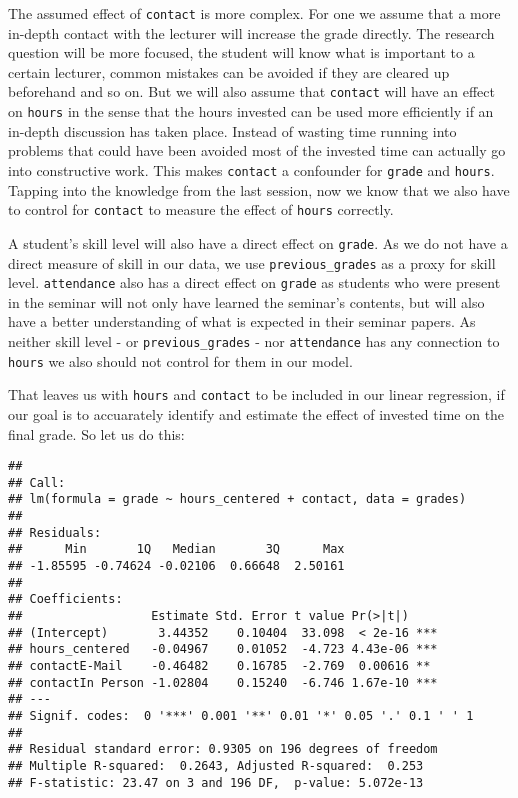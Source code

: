 \documentclass[
]{book}
\begin{document}
The assumed effect of \texttt{contact} is more complex. For one we assume that a more
in-depth contact with the lecturer will increase the grade directly. The
research question will be more focused, the student will know what is important
to a certain lecturer, common mistakes can be avoided if they are cleared up
beforehand and so on. But we will also assume that \texttt{contact} will have an effect
on \texttt{hours} in the sense that the hours invested can be used more efficiently if
an in-depth discussion has taken place. Instead of wasting time running into
problems that could have been avoided most of the invested time can actually go
into constructive work. This makes \texttt{contact} a confounder for \texttt{grade} and
\texttt{hours}. Tapping into the knowledge from the last session, now we know that we
also have to control for \texttt{contact} to measure the effect of \texttt{hours} correctly.

A student's skill level will also have a direct effect on \texttt{grade}. As we do not
have a direct measure of skill in our data, we use \texttt{previous\_grades} as a proxy
for skill level. \texttt{attendance} also has a direct effect on \texttt{grade} as students
who were present in the seminar will not only have learned the seminar's
contents, but will also have a better understanding of what is expected in their
seminar papers. As neither skill level - or \texttt{previous\_grades} - nor \texttt{attendance}
has any connection to \texttt{hours} we also should not control for them in our model.

That leaves us with \texttt{hours} and \texttt{contact} to be included in our linear
regression, if our goal is to accuarately identify and estimate the effect of
invested time on the final grade. So let us do this:

\begin{verbatim}
## 
## Call:
## lm(formula = grade ~ hours_centered + contact, data = grades)
## 
## Residuals:
##      Min       1Q   Median       3Q      Max 
## -1.85595 -0.74624 -0.02106  0.66648  2.50161 
## 
## Coefficients:
##                  Estimate Std. Error t value Pr(>|t|)    
## (Intercept)       3.44352    0.10404  33.098  < 2e-16 ***
## hours_centered   -0.04967    0.01052  -4.723 4.43e-06 ***
## contactE-Mail    -0.46482    0.16785  -2.769  0.00616 ** 
## contactIn Person -1.02804    0.15240  -6.746 1.67e-10 ***
## ---
## Signif. codes:  0 '***' 0.001 '**' 0.01 '*' 0.05 '.' 0.1 ' ' 1
## 
## Residual standard error: 0.9305 on 196 degrees of freedom
## Multiple R-squared:  0.2643, Adjusted R-squared:  0.253 
## F-statistic: 23.47 on 3 and 196 DF,  p-value: 5.072e-13
\end{verbatim}
\end{document}
